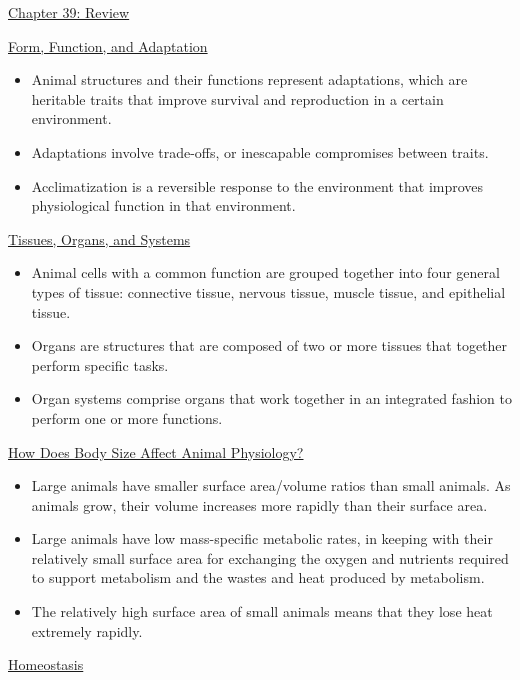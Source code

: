 \documentclass[12pt,letterpaper]{article}
\begin{document}
\hypertarget{39.r}{}
    \begin{probbox}{\hyperlink{39}{Chapter 39: Review}}{}\end{probbox}
    \hyperlink{39.1}{Form, Function, and Adaptation}
    \begin{itemize}
            \item Animal structures and their functions represent adaptations, which are heritable traits that improve survival and reproduction in a certain environment.
            \item Adaptations involve trade-offs, or inescapable compromises between traits.
            \item Acclimatization is a reversible response to the environment that improves physiological function in that environment.
        \end{itemize}
    \hyperlink{39.2}{Tissues, Organs, and Systems}
    \begin{itemize}
            \item Animal cells with a common function are grouped together into
            four general types of tissue: connective tissue, nervous tissue, muscle tissue, and epithelial tissue.
            \item Organs are structures that are composed of two or more tissues that together perform specific tasks.
            \item Organ systems comprise organs that work together in an integrated fashion to perform one or more functions.
    \end{itemize}
    \hyperlink{39.3}{How Does Body Size Affect Animal Physiology?}
    \begin{itemize}
            \item Large animals have smaller surface area/volume ratios than small animals. As animals grow, their volume increases more rapidly than their surface area. 
            \item Large animals have low mass-specific metabolic rates, in keeping with their relatively small surface area for exchanging the oxygen and nutrients required to support metabolism and the wastes and heat produced by metabolism.
            \item The relatively high surface area of small animals means that they lose heat extremely rapidly.
    \end{itemize}
    \hyperlink{39.4}{Homeostasis}
\end{document}
